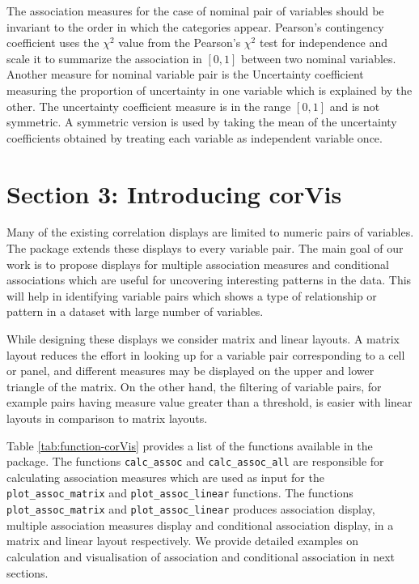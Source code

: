 The association measures for the case of nominal pair of variables
should be invariant to the order in which the categories appear.
Pearson's contingency coefficient uses the \({\chi}^2\) value from the
Pearson's \({\chi}^2\) test for independence and scale it to summarize
the association in \([0,1]\) between two nominal variables. Another
measure for nominal variable pair is the Uncertainty coefficient
\citep{theil1970estimation} measuring the proportion of uncertainty in
one variable which is explained by the other. The uncertainty
coefficient measure is in the range \([0,1]\) and is not symmetric. A
symmetric version is used by taking the mean of the uncertainty
coefficients obtained by treating each variable as independent variable
once.

\hypertarget{section-3-introducing-corvis}{%
\section{Section 3: Introducing
corVis}\label{section-3-introducing-corvis}}

Many of the existing correlation displays are limited to numeric pairs
of variables. The package  extends these displays to
every variable pair. The main goal of our work is to propose displays
for multiple association measures and conditional associations which are
useful for uncovering interesting patterns in the data. This will help
in identifying variable pairs which shows a type of relationship or
pattern in a dataset with large number of variables.

While designing these displays we consider matrix and linear layouts. A
matrix layout reduces the effort in looking up for a variable pair
corresponding to a cell or panel, and different measures may be
displayed on the upper and lower triangle of the matrix. On the other
hand, the filtering of variable pairs, for example pairs having measure
value greater than a threshold, is easier with linear layouts in
comparison to matrix layouts.

Table \ref{tab:function-corVis} provides a list of the functions
available in the package. The functions \texttt{calc\_assoc} and
\texttt{calc\_assoc\_all} are responsible for calculating association
measures which are used as input for the \texttt{plot\_assoc\_matrix}
and \texttt{plot\_assoc\_linear} functions. The functions
\texttt{plot\_assoc\_matrix} and \texttt{plot\_assoc\_linear} produces
association display, multiple association measures display and
conditional association display, in a matrix and linear layout
respectively. We provide detailed examples on calculation and
visualisation of association and conditional association in next
sections.

